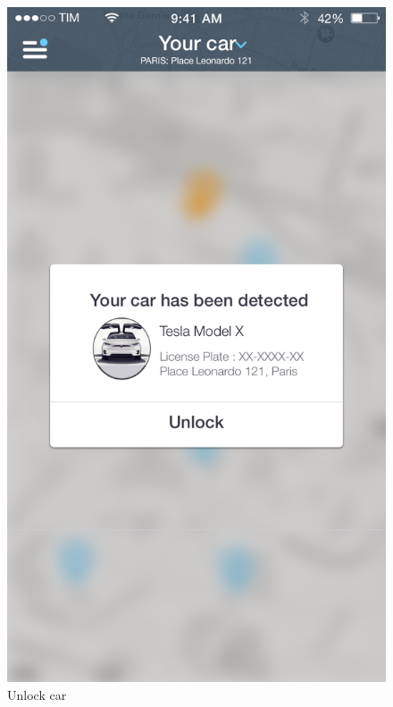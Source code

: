 \documentclass[12pt]{article}
\begin{document}
 	 	\begin{figure}
		 \centering	
		 \includegraphics[scale=0.25]{Images/Sblocca.png}
		 \caption{Unlock car}
		 \endminipage
		 \centering

\end{figure}
\end{document}
